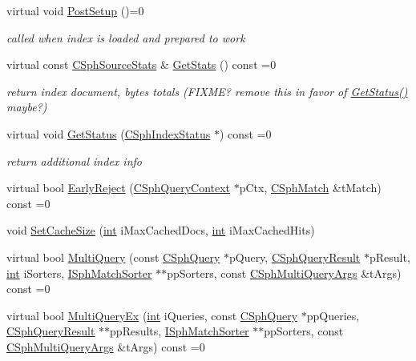 \begin{DoxyCompactItemize}
virtual void \hyperlink{classCSphIndex_a903008e29c37e817e72e7e92d2ccb964}{Post\-Setup} ()=0
\begin{DoxyCompactList}\small\item\em called when index is loaded and prepared to work \end{DoxyCompactList}\item 
virtual const \hyperlink{structCSphSourceStats}{C\-Sph\-Source\-Stats} \& \hyperlink{classCSphIndex_a993b7194dfa869f1fc53e88dbaea312e}{Get\-Stats} () const =0
\begin{DoxyCompactList}\small\item\em return index document, bytes totals (F\-I\-X\-M\-E? remove this in favor of \hyperlink{classCSphIndex_aa62060b8df807b6beeb93efda865cd60}{Get\-Status()} maybe?) \end{DoxyCompactList}\item 
virtual void \hyperlink{classCSphIndex_aa62060b8df807b6beeb93efda865cd60}{Get\-Status} (\hyperlink{structCSphIndexStatus}{C\-Sph\-Index\-Status} $\ast$) const =0
\begin{DoxyCompactList}\small\item\em return additional index info \end{DoxyCompactList}\item 
virtual bool \hyperlink{classCSphIndex_a9b37c81e5a2ffe7be4d2a0265e8e7081}{Early\-Reject} (\hyperlink{classCSphQueryContext}{C\-Sph\-Query\-Context} $\ast$p\-Ctx, \hyperlink{classCSphMatch}{C\-Sph\-Match} \&t\-Match) const =0
\item 
void \hyperlink{classCSphIndex_a09440e2c5a01875420ae16cbf44f81dd}{Set\-Cache\-Size} (\hyperlink{sphinxexpr_8cpp_a4a26e8f9cb8b736e0c4cbf4d16de985e}{int} i\-Max\-Cached\-Docs, \hyperlink{sphinxexpr_8cpp_a4a26e8f9cb8b736e0c4cbf4d16de985e}{int} i\-Max\-Cached\-Hits)
\item 
virtual bool \hyperlink{classCSphIndex_af9509496c555985ec9ccec4c2260391d}{Multi\-Query} (const \hyperlink{classCSphQuery}{C\-Sph\-Query} $\ast$p\-Query, \hyperlink{classCSphQueryResult}{C\-Sph\-Query\-Result} $\ast$p\-Result, \hyperlink{sphinxexpr_8cpp_a4a26e8f9cb8b736e0c4cbf4d16de985e}{int} i\-Sorters, \hyperlink{classISphMatchSorter}{I\-Sph\-Match\-Sorter} $\ast$$\ast$pp\-Sorters, const \hyperlink{structCSphMultiQueryArgs}{C\-Sph\-Multi\-Query\-Args} \&t\-Args) const =0
\item 
virtual bool \hyperlink{classCSphIndex_a19f5a3df99344e37a1d8a1e9ac7f8c22}{Multi\-Query\-Ex} (\hyperlink{sphinxexpr_8cpp_a4a26e8f9cb8b736e0c4cbf4d16de985e}{int} i\-Queries, const \hyperlink{classCSphQuery}{C\-Sph\-Query} $\ast$pp\-Queries, \hyperlink{classCSphQueryResult}{C\-Sph\-Query\-Result} $\ast$$\ast$pp\-Results, \hyperlink{classISphMatchSorter}{I\-Sph\-Match\-Sorter} $\ast$$\ast$pp\-Sorters, const \hyperlink{structCSphMultiQueryArgs}{C\-Sph\-Multi\-Query\-Args} \&t\-Args) const =0
$$
\end{DoxyCompactItemize}
